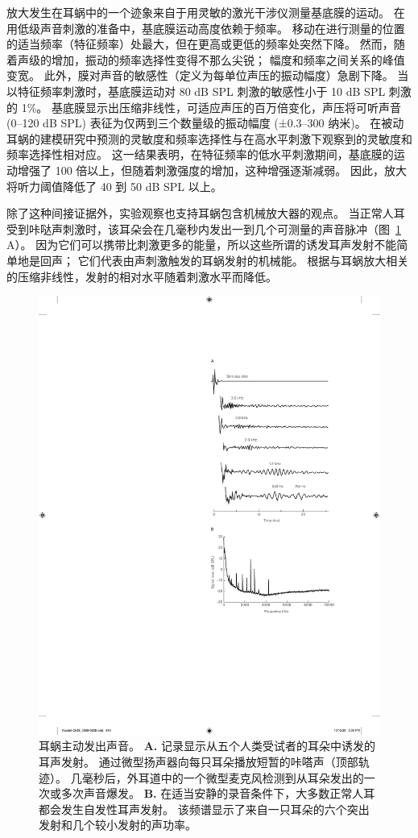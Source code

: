 放大发生在耳蜗中的一个迹象来自于用灵敏的激光干涉仪测量基底膜的运动。
在用低级声音刺激的准备中，基底膜运动高度依赖于频率。
移动在进行测量的位置的适当频率（特征频率）处最大，但在更高或更低的频率处突然下降。
然而，随着声级的增加，振动的频率选择性变得不那么尖锐；
幅度和频率之间关系的峰值变宽。
此外，膜对声音的敏感性（定义为每单位声压的振动幅度）急剧下降。
当以特征频率刺激时，基底膜运动对 80 dB SPL 刺激的敏感性小于 10 dB SPL 刺激的 1\%。
基底膜显示出压缩非线性，可适应声压的百万倍变化，声压将可听声音 (0–120 dB SPL) 表征为仅两到三个数量级的振动幅度 (±0.3–300 纳米)。
在被动耳蜗的建模研究中预测的灵敏度和频率选择性与在高水平刺激下观察到的灵敏度和频率选择性相对应。
这一结果表明，在特征频率的低水平刺激期间，基底膜的运动增强了 100 倍以上，但随着刺激强度的增加，这种增强逐渐减弱。
因此，放大将听力阈值降低了 40 到 50 dB SPL 以上。


除了这种间接证据外，实验观察也支持耳蜗包含机械放大器的观点。
当正常人耳受到咔哒声刺激时，该耳朵会在几毫秒内发出一到几个可测量的声音脉冲（图~\ref{fig:26_13} A）。
因为它们可以携带比刺激更多的能量，所以这些所谓的诱发耳声发射不能简单地是回声；
它们代表由声刺激触发的耳蜗发射的机械能。
根据与耳蜗放大相关的压缩非线性，发射的相对水平随着刺激水平而降低。


\begin{figure}[htbp]
	\centering
	\includegraphics[width=0.5\linewidth]{chap26/fig_26_13}
	\caption{耳蜗主动发出声音。
		\textbf{A.} 记录显示从五个人类受试者的耳朵中诱发的耳声发射。
		通过微型扬声器向每只耳朵播放短暂的咔嗒声（顶部轨迹）。
		几毫秒后，外耳道中的一个微型麦克风检测到从耳朵发出的一次或多次声音爆发\cite{wilson1980evidence}。
		\textbf{B.} 在适当安静的录音条件下，大多数正常人耳都会发生自发性耳声发射。
		该频谱显示了来自一只耳朵的六个突出发射和几个较小发射的声功率\cite{murphy1995relaxation}。}
	\label{fig:26_13}
\end{figure}



